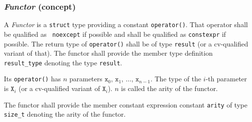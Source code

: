 %
%
%
%
%
%
%

\subsubsection{\textit{Functor} (concept)}
A \textit{Functor} is a \texttt{struct} type     providing a constant
\texttt{operator()}. That operator shall be qualified as     \texttt{
noexcept} if possible and shall be qualified as    \texttt{constexpr}
if possible. The return type of \texttt{operator()} shall be of  type
\texttt{result} (or a cv-qualified variant of that). The      functor
shall provide the member type definition        \texttt{result\_type}
denoting the type \texttt{result}.\newline

Its \texttt{operator()} has $n$ parameters            $\texttt{x}_0$,
$\texttt{x}_1$, $\ldots$, $\texttt{x}_{n-1}$. The type of the $i$-th
parameter is $\texttt{X}_i$ (or a cv-qualified variant of $\texttt{X
}_i$). $n$ is called the arity of the functor.\newline

The functor shall provide the member constant expression     constant
\texttt{arity} of type \texttt{size\_t} denoting the arity         of
the functor.\newline

